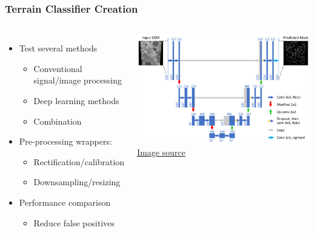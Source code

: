 \documentclass[aspectratio=169]{rubeamer}
\newif\ifpause
\newcommand{\mypause}{\ifpause \pause \fi}
\begin{document}
\begin{frame}
  \frametitle{Terrain Classifier Creation}
  \begin{columns}
      \begin{itemize}
        \item Test several methods
        \mypause
        \begin{itemize}
          \item Conventional signal/image processing%
          \mypause
          \item Deep learning methods%
          \mypause
          \item Combination
        \end{itemize}
        \mypause
        \item Pre-processing wrappers:
        \begin{itemize}
          \item Rectification/calibration
          \mypause
          \item Downsampling/resizing
        \end{itemize}
        \mypause
        \item Performance comparison
        \begin{itemize}
          \item Reduce false positives
          \mypause
        \end{itemize}
      \end{itemize}
    \centering
    \includegraphics[width=\textwidth]{Convolutional-neural-network-CNN-architecture-based-on-UNET-Ronneberger-et-al}\\
    \href{https://www.researchgate.net/figure/Convolutional-neural-network-CNN-architecture-based-on-UNET-Ronneberger-et-al_fig2_323597886}{Image source}
  \end{columns}
\end{frame}
\end{document}
